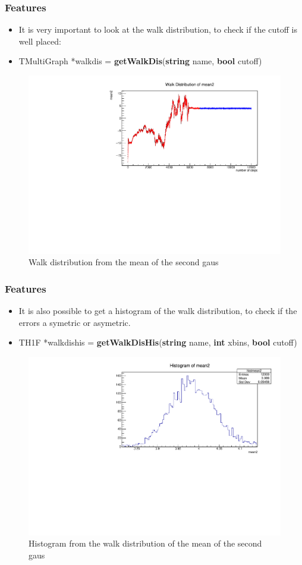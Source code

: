 \documentclass{beamer}
\begin{document}
\begin{frame}
 \frametitle{Features}
 \begin{itemize}
  \item It is very important to look at the walk distribution, to check if the cutoff is well placed:
  \item TMultiGraph *walkdis = \textbf{getWalkDis}(\textbf{string} name, \textbf{bool} cutoff)
 \end{itemize}

 \begin{figure}
  \includegraphics[width=0.8\linewidth]{figures/walkdis_mean2}
  \caption{Walk distribution from the mean of the second gaus}
 \end{figure}

\end{frame}

\begin{frame}
 \frametitle{Features}
 \begin{itemize}
  \item It is also possible to get a histogram of the walk distribution, to check if the errors a symetric or asymetric.
  \item TH1F *walkdishis = \textbf{getWalkDisHis}(\textbf{string} name, \textbf{int} xbins, \textbf{bool} cutoff)
 \end{itemize}

 \begin{figure}
  \includegraphics[width=0.8\linewidth]{figures/walkdishis_mean2}
  \caption{Histogram from the walk distribution of the mean of the second gaus}
 \end{figure}

\end{frame}
\end{document}
